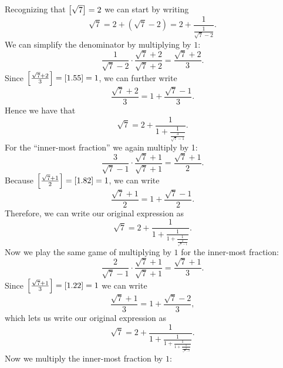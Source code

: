 \documentclass{article}
\begin{document}
Recognizing that $\sbr[1]{\sqrt{7}} = 2$ we can start by writing
%
\begin{equation*}
    \sqrt{7} = 2 + (\sqrt{7} - 2) = 2 + \frac{1}{\frac{1}{\sqrt{7} - 2}}
    .
\end{equation*}
%
We can simplify the denominator by multiplying by $1$:
%
\begin{equation*}
    \frac{1}{\sqrt{7} - 2} \cdot \frac{\sqrt{7} + 2}{\sqrt{7} + 2}
    = \frac{\sqrt{7} + 2}{3}
    .
\end{equation*}
%
Since $\sbr{\frac{\sqrt{7} + 2}{3}} = [1.55] = 1$, we can further write
%
\begin{equation*}
    \frac{\sqrt{7} + 2}{3} = 1 + \frac{\sqrt{7} - 1}{3}
    .
\end{equation*}
%
Hence we have that
%
\begin{equation*}
    \sqrt{7} = 2 + \frac{1}{1 + \frac{1}{\frac{3}{\sqrt{7} - 1}}}
    .
\end{equation*}
%
For the ``inner-most fraction'' we again multiply by 1:
%
\begin{equation*}
    \frac{3}{\sqrt{7} - 1} \cdot \frac{\sqrt{7} + 1}{\sqrt{7} + 1} = \frac{\sqrt{7} + 1}{2}
    .
\end{equation*}
%
Because $\sbr{\frac{\sqrt{7} + 1}{2}} = [1.82] = 1$, we can write
%
\begin{equation*}
    \frac{\sqrt{7} + 1}{2} = 1 + \frac{\sqrt{7} - 1}{2}
    .
\end{equation*}
%
Therefore, we can write our original expression as
%
\begin{equation*}
    \sqrt{7} = 2 + \frac{1}{1 + \frac{1}{1 + \frac{1}{\frac{2}{\sqrt{7} - 1}}}}
    .
\end{equation*}
%
Now we play the same game of multiplying by $1$ for the inner-most fraction:
%
\begin{equation*}
    \frac{2}{\sqrt{7} - 1} \cdot \frac{\sqrt{7} + 1}{\sqrt{7} + 1} = \frac{\sqrt{7} + 1}{3}
    .
\end{equation*}
%
Since $\sbr{\frac{\sqrt{7} + 1}{3}} = [1.22] = 1$ we can write
%
\begin{equation*}
    \frac{\sqrt{7} + 1}{3} = 1 + \frac{\sqrt{7} - 2}{3}
    ,
\end{equation*}
%
which lets us write our original expression as
%
\begin{equation*}
    \sqrt{7} = 2 + \frac{1}{1 + \frac{1}{1 + \frac{1}{1 + \frac{1}{\frac{3}{\sqrt{7} - 2}}}}}
    .
\end{equation*}
%
Now we multiply the inner-most fraction by $1$:
\end{document}
